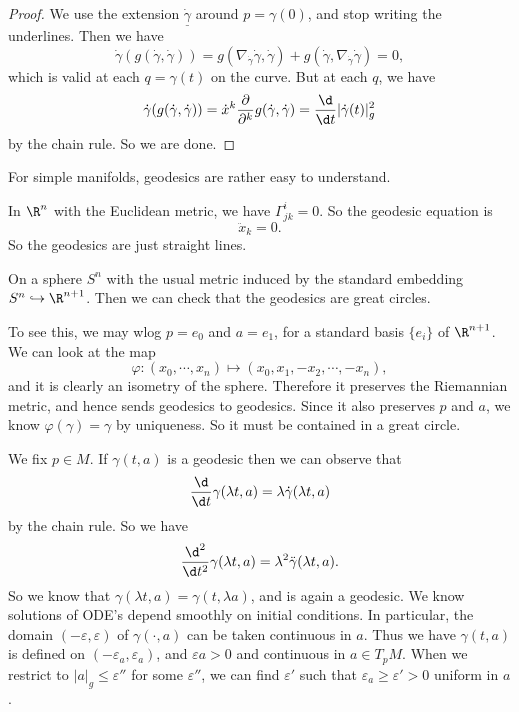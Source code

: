 \documentclass[a4paper]{article}
\begin{document}
\begin{proof}
  We use the extension $\dot{\underline{\gamma}}$ around $p = \gamma(0)$, and stop writing the underlines. Then we have
  \[
    \dot{\gamma}(g(\dot{\gamma}, \dot{\gamma})) = g(\nabla_{\dot{\gamma}} \dot{\gamma}, \dot{\gamma})+ g(\dot{\gamma}, \nabla_{\dot{\gamma}} \dot{\gamma}) = 0,
  \]
  which is valid at each $q = \gamma(t)$ on the curve. But at each $q$, we have
  \[
    \dot{\gamma}(g(\dot{\gamma}, \dot{\gamma})) = \dot{x}^k \frac{\partial}{\partial^k} g(\dot{\gamma}, \dot{\gamma}) = \frac{\d}{\d t} |\dot{\gamma}(t)|_g^2
  \]
  by the chain rule. So we are done.
\end{proof}

For simple manifolds, geodesics are rather easy to understand.
\begin{eg}
  In $\R^n$ with the Euclidean metric, we have $\Gamma^i_{jk} = 0$. So the geodesic equation is
  \[
    \ddot{x}_k = 0.
  \]
  So the geodesics are just straight lines.
\end{eg}

\begin{eg}
  On a sphere $S^n$ with the usual metric induced by the standard embedding $S^n \hookrightarrow \R^{n + 1}$. Then we can check that the geodesics are great circles.

  To see this, we may wlog $p = e_0$ and $a = e_1$, for a standard basis $\{e_i\}$ of $\R^{n + 1}$. We can look at the map
  \[
    \varphi: (x_0, \cdots, x_n) \mapsto (x_0, x_1, -x_2, \cdots, -x_n),
  \]
  and it is clearly an isometry of the sphere. Therefore it preserves the Riemannian metric, and hence sends geodesics to geodesics. Since it also preserves $p$ and $a$, we know $\varphi(\gamma) = \gamma$ by uniqueness. So it must be contained in a great circle.
\end{eg}

We fix $p \in M$. If $\gamma(t, a)$ is a geodesic then we can observe that
\[
  \frac{\d}{\d t} \gamma(\lambda t, a) = \lambda \dot{\gamma} (\lambda t, a)
\]
by the chain rule. So we have
\[
  \frac{\d^2}{\d t^2} \gamma(\lambda t, a) = \lambda^2 \ddot{\gamma}(\lambda t, a).
\]
So we know that $\gamma(\lambda t, a) = \gamma(t, \lambda a)$, and is again a geodesic. We know solutions of ODE's depend smoothly on initial conditions. In particular, the domain $(-\varepsilon, \varepsilon)$ of $\gamma(\cdot, a)$ can be taken continuous in $a$. Thus we have $\gamma(t, a)$ is defined on $(-\varepsilon_a, \varepsilon_a)$, and $\varepsilon a > 0$ and continuous in $a \in T_p M$. When we restrict to $|a|_g \leq \varepsilon''$ for some $\varepsilon''$, we can find $\varepsilon'$ such that $\varepsilon_a \geq \varepsilon' > 0$ uniform in $a$.
\end{document}
